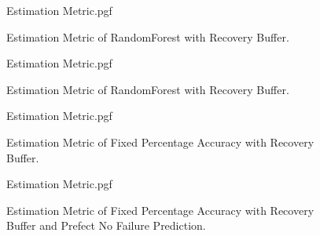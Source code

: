 \documentclass[letterpaper, 10 pt, conference]{ieeeconf}  %
\begin{document}
\begin{figure}[!htb]
	\begin{center}
		{Estimation Metric.pgf}
	\end{center}
	\caption[Estimation Metric of RandomForest with Recovery Buffer]{Estimation Metric of RandomForest with Recovery Buffer.}
	\label{fig:Summary Estimation Accuracy EKF-ignore RandomForest with Recovery Buffer}
\end{figure}

\begin{figure}[!htb]
	\begin{center}
		{Estimation Metric.pgf}
	\end{center}
	\caption[Estimation Metric of RandomForest with Recovery Buffer]{Estimation Metric of RandomForest with Recovery Buffer.}
	\label{fig:Estimation Accuracy EKF-ignore RandomForest with Recovery Buffer}
\end{figure}

\begin{figure}[!htb]
	\begin{center}
		{Estimation Metric.pgf}
	\end{center}
	\caption[Estimation Metric of $90.0\%$ Accuracy with Recovery Buffer]{Estimation Metric of Fixed Percentage Accuracy with Recovery Buffer.}
	\label{fig:Estimation Accuracy EKF-ignore RandomForest withoutt Buffer}
\end{figure}

\begin{figure}[!htb]
	\begin{center}
		{Estimation Metric.pgf}
	\end{center}
	\caption[Estimation Metric of $90.0\%$ Accuracy with Recovery Buffer and Prefect No Failure Prediction]{Estimation Metric of Fixed Percentage Accuracy with Recovery Buffer and Prefect No Failure Prediction.}
	\label{fig:Estimation Accuracy EKF-ignore 90 with Recovery Buffer and prefectNoFailurePrediction}
\end{figure}
\end{document}
